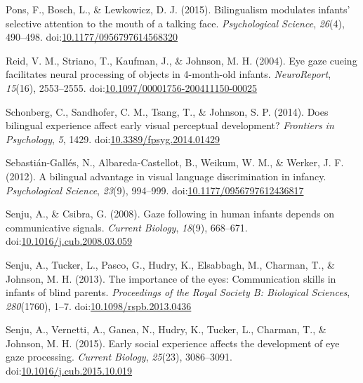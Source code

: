 \documentclass[,man,floatsintext]{apa6}
\begin{document}
\leavevmode\hypertarget{ref-Pons_etal_2015}{}%
Pons, F., Bosch, L., \& Lewkowicz, D. J. (2015). Bilingualism modulates infants' selective attention to the mouth of a talking face. \emph{Psychological Science}, \emph{26}(4), 490--498. doi:\href{https://doi.org/10.1177/0956797614568320}{10.1177/0956797614568320}

\leavevmode\hypertarget{ref-Reid_etal_2004}{}%
Reid, V. M., Striano, T., Kaufman, J., \& Johnson, M. H. (2004). Eye gaze cueing facilitates neural processing of objects in 4-month-old infants. \emph{NeuroReport}, \emph{15}(16), 2553--2555. doi:\href{https://doi.org/10.1097/00001756-200411150-00025}{10.1097/00001756-200411150-00025}

\leavevmode\hypertarget{ref-Schonberg_etal_2014}{}%
Schonberg, C., Sandhofer, C. M., Tsang, T., \& Johnson, S. P. (2014). Does bilingual experience affect early visual perceptual development? \emph{Frontiers in Psychology}, \emph{5}, 1429. doi:\href{https://doi.org/10.3389/fpsyg.2014.01429}{10.3389/fpsyg.2014.01429}

\leavevmode\hypertarget{ref-Sebastian-Galles_etal_2012}{}%
Sebastián-Gallés, N., Albareda-Castellot, B., Weikum, W. M., \& Werker, J. F. (2012). A bilingual advantage in visual language discrimination in infancy. \emph{Psychological Science}, \emph{23}(9), 994--999. doi:\href{https://doi.org/10.1177/0956797612436817}{10.1177/0956797612436817}

\leavevmode\hypertarget{ref-Senju_Csibra_2008}{}%
Senju, A., \& Csibra, G. (2008). Gaze following in human infants depends on communicative signals. \emph{Current Biology}, \emph{18}(9), 668--671. doi:\href{https://doi.org/10.1016/j.cub.2008.03.059}{10.1016/j.cub.2008.03.059}

\leavevmode\hypertarget{ref-Senju_etal_2013}{}%
Senju, A., Tucker, L., Pasco, G., Hudry, K., Elsabbagh, M., Charman, T., \& Johnson, M. H. (2013). The importance of the eyes: Communication skills in infants of blind parents. \emph{Proceedings of the Royal Society B: Biological Sciences}, \emph{280}(1760), 1--7. doi:\href{https://doi.org/10.1098/rspb.2013.0436}{10.1098/rspb.2013.0436}

\leavevmode\hypertarget{ref-Senju_etal_2015}{}%
Senju, A., Vernetti, A., Ganea, N., Hudry, K., Tucker, L., Charman, T., \& Johnson, M. H. (2015). Early social experience affects the development of eye gaze processing. \emph{Current Biology}, \emph{25}(23), 3086--3091. doi:\href{https://doi.org/10.1016/j.cub.2015.10.019}{10.1016/j.cub.2015.10.019}
\end{document}
